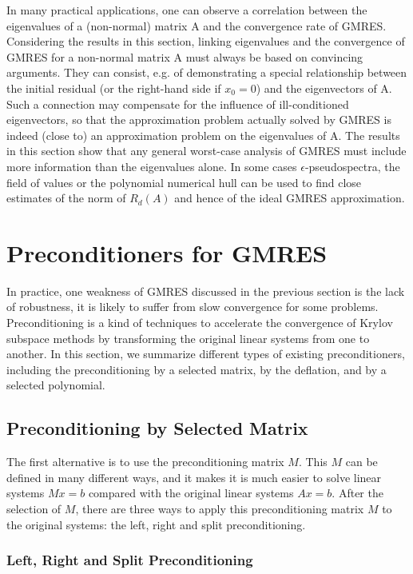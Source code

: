 {In many practical applications, one can observe a correlation between the eigenvalues of a (non-normal) matrix A and the convergence rate of GMRES. Considering the results in this section, linking eigenvalues and the convergence of GMRES for a non-normal matrix A must always be based on convincing arguments. They can consist, e.g. of demonstrating a special relationship between the initial residual (or the right-hand side if $x_0=0$) and the eigenvectors of A. Such a connection may compensate for the influence of ill-conditioned eigenvectors, so that the approximation problem actually solved by GMRES is indeed (close to) an approximation problem on the eigenvalues of A. The results in this section show that any general worst-case analysis of GMRES must include more information than the eigenvalues alone. In some cases $\epsilon$-pseudospectra, the field of values or the polynomial numerical hull can be used to find close estimates of the norm of $R_d(A)$ and hence of the ideal GMRES approximation. 
	
\section{Preconditioners for GMRES}\label{Preconditioners for GMRES}

In practice, one weakness of GMRES discussed in the previous section is the lack of robustness, it is likely to suffer from slow convergence for some problems. Preconditioning is a kind of techniques to accelerate the convergence of Krylov subspace methods by transforming the original linear systems from one to another. In this section, we summarize different types of existing preconditioners, including the preconditioning by a selected matrix, by the deflation, and by a selected polynomial.

\subsection{Preconditioning by Selected Matrix}

The first alternative is to use the preconditioning matrix $M$. This $M$ can be defined in many different ways, and it makes it is much easier to solve linear systems $Mx=b$ compared with the original linear systems $Ax=b$. After the selection of $M$, there are three ways to apply this preconditioning matrix $M$ to the original systems: the left, right and split preconditioning.

\subsubsection{Left, Right and Split Preconditioning}\label{Left, Right and Split Preconditioning}

}
